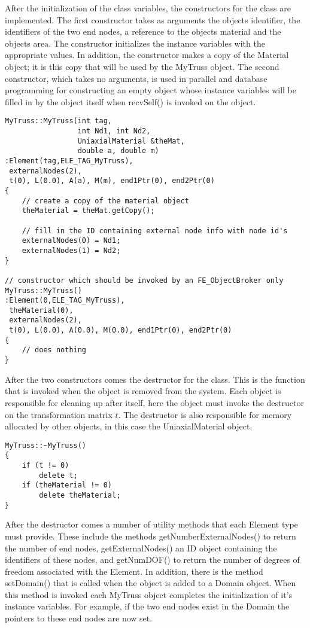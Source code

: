 \documentclass[12pt]{article}
\begin{document}
After the initialization of the class variables, the constructors for
the class are implemented. The first constructor takes as arguments
the objects identifier, the identifiers of the two end nodes, a
reference to the objects material and the objects area. The
constructor initializes the instance variables with the
appropriate values. In addition, the constructor makes a copy of the
Material object; it is this copy that will be used by the MyTruss
object. The second constructor, which takes no arguments,
is used in parallel and database programming for constructing an empty
object whose instance variables will be filled in by the object itself
when {\sf recvSelf()} is invoked on the object.

{\sf\small
\begin{verbatim}
MyTruss::MyTruss(int tag, 
                 int Nd1, int Nd2, 
                 UniaxialMaterial &theMat, 
                 double a, double m)
:Element(tag,ELE_TAG_MyTruss),     
 externalNodes(2),
 t(0), L(0.0), A(a), M(m), end1Ptr(0), end2Ptr(0)
{	
    // create a copy of the material object
    theMaterial = theMat.getCopy();

    // fill in the ID containing external node info with node id's
    externalNodes(0) = Nd1;
    externalNodes(1) = Nd2;        
}

// constructor which should be invoked by an FE_ObjectBroker only
MyTruss::MyTruss()
:Element(0,ELE_TAG_MyTruss),     
 theMaterial(0),
 externalNodes(2),
 t(0), L(0.0), A(0.0), M(0.0), end1Ptr(0), end2Ptr(0)
{
    // does nothing
}
\end{verbatim}
}


After the two constructors comes the destructor for the class. This is
the function that is invoked when the object is removed from the
system. Each object is responsible for cleaning up after itself, here
the object must invoke the destructor on the transformation matrix
$t$. The destructor is also responsible for memory allocated by other
objects, in this case the UniaxialMaterial object.

{\sf\small
\begin{verbatim}
MyTruss::~MyTruss()
{
    if (t != 0)
        delete t;
    if (theMaterial != 0)
        delete theMaterial;    
}
\end{verbatim}
}

After the destructor comes a number of utility methods that each
Element type must provide. These include the  methods {\sf
getNumberExternalNodes()} to return the number of end nodes, {\sf
getExternalNodes()} an ID object containing the identifiers of these
nodes, and {\sf getNumDOF()} to return the number of degrees of freedom 
associated with the Element. In addition, there is the method {\sf
setDomain()} that is called when the object is added to a Domain
object. When this method is invoked each MyTruss object completes the
initialization of it's instance variables. For example, if the two end
nodes exist in the Domain the pointers to these end nodes are now set.
\end{document}
